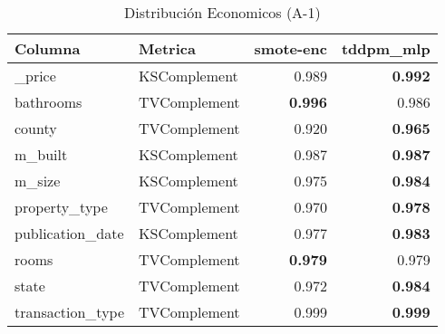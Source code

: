 \begin{table}[H]
\centering
\caption{Distribución Economicos (A-1)}
\label{table-shape-economicos-a-1}
\begin{tabular}{|l|l|r|r|}
\hline
\rowcolor[gray]{0.8}
Columna & Metrica & smote-enc & tddpm\_mlp \\
\hline \_price & KSComplement & 0.989 & \bfseries 0.992 \\
\hline bathrooms & TVComplement & \bfseries 0.996 & 0.986 \\
\hline county & TVComplement & 0.920 & \bfseries 0.965 \\
\hline m\_built & KSComplement & 0.987 & \bfseries 0.987 \\
\hline m\_size & KSComplement & 0.975 & \bfseries 0.984 \\
\hline property\_type & TVComplement & 0.970 & \bfseries 0.978 \\
\hline publication\_date & KSComplement & 0.977 & \bfseries 0.983 \\
\hline rooms & TVComplement & \bfseries 0.979 & 0.979 \\
\hline state & TVComplement & 0.972 & \bfseries 0.984 \\
\hline transaction\_type & TVComplement & 0.999 & \bfseries 0.999 \\
\hline
\end{tabular}
\end{table}
